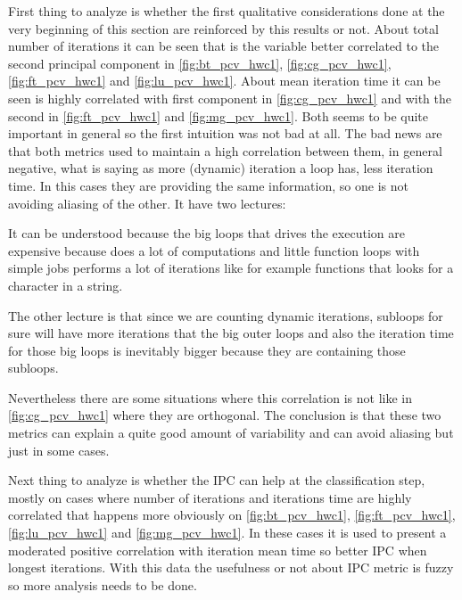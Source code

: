 First thing to analyze is whether the first qualitative considerations done at
the very beginning of this section are reinforced by this results or not. 
About total number of
iterations it can be seen that is the variable better correlated to the 
second principal component in \ref{fig:bt_pcv_hwc1}, \ref{fig:cg_pcv_hwc1},
\ref{fig:ft_pcv_hwc1} and \ref{fig:lu_pcv_hwc1}. About mean 
iteration time it can be seen is highly correlated with first component in
\ref{fig:cg_pcv_hwc1} and with the second in
\ref{fig:ft_pcv_hwc1} and \ref{fig:mg_pcv_hwc1}. Both seems to be quite
important in general so the first intuition was not bad at all. The bad news are
that both metrics used to maintain a high correlation between them, in general
negative, what is saying as more (dynamic) iteration a loop has, less iteration
time. In this cases they are providing the same information, so one is not
avoiding aliasing of the other. It have two lectures:
\begin{enumerate*}[label=\roman*)]
  \item It can be understood because the big loops that drives the execution are
    expensive because does a lot of computations and little function loops with
    simple jobs performs a lot of iterations like for example functions that
    looks for a character in a string.
  \item The other lecture is that since we are counting dynamic iterations,
    subloops for sure will have more iterations that the big outer loops and
    also the iteration time for those big loops is inevitably bigger because
    they are containing those subloops.
\end{enumerate*}
Nevertheless there are some situations where this correlation is not like in
\ref{fig:cg_pcv_hwc1} where they are orthogonal. The
conclusion is that these two metrics can explain a quite good amount of
variability and can avoid aliasing but just in some cases.

Next thing to analyze is whether the IPC can help at the
classification step, mostly on cases where number of iterations and iterations
time are highly correlated that happens more obviously on \ref{fig:bt_pcv_hwc1},
\ref{fig:ft_pcv_hwc1}, \ref{fig:lu_pcv_hwc1} and \ref{fig:mg_pcv_hwc1}. In these
cases it is used to present a moderated positive correlation with iteration mean
time so better IPC when longest iterations. With this data the usefulness or not
about IPC metric is fuzzy so more analysis needs to be done.

